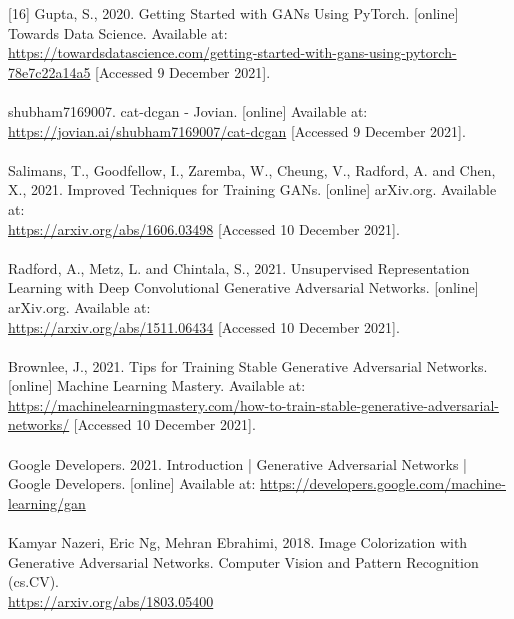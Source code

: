 \documentclass[14pt]{article}
\begin{document}
[16] Gupta, S., 2020. Getting Started with GANs Using PyTorch. [online] Towards Data Science. Available at:
\\
\url{https://towardsdatascience.com/getting-started-with-gans-using-pytorch-78e7c22a14a5} [Accessed 9 December 2021].
\\ \\
[17] shubham7169007. cat-dcgan - Jovian. [online] Available at:\\ \url{https://jovian.ai/shubham7169007/cat-dcgan} [Accessed 9 December 2021].
\\ \\ 
[18] Salimans, T., Goodfellow, I., Zaremba, W., Cheung, V., Radford, A. and Chen, X., 2021. Improved Techniques for Training GANs. [online] arXiv.org. Available at: \\\url{https://arxiv.org/abs/1606.03498} [Accessed 10 December 2021]. 
\\ \\ 
[19] Radford, A., Metz, L. and Chintala, S., 2021. Unsupervised Representation Learning with Deep Convolutional Generative Adversarial Networks. [online] arXiv.org. Available at:\\ \url{https://arxiv.org/abs/1511.06434} [Accessed 10 December 2021]. 
\\ \\
[20] Brownlee, J., 2021. Tips for Training Stable Generative Adversarial Networks. [online] Machine Learning Mastery. Available at:\\ \url{https://machinelearningmastery.com/how-to-train-stable-generative-adversarial-networks/} [Accessed 10 December 2021]. 
\\
\\
[21] Google Developers. 2021. Introduction  |  Generative Adversarial Networks  |  Google Developers. [online] Available at: \url{https://developers.google.com/machine-learning/gan} 
\\
\\
[22] Kamyar Nazeri, Eric Ng, Mehran Ebrahimi, 2018. Image Colorization with Generative Adversarial Networks. Computer Vision and Pattern Recognition (cs.CV).
\\
\url{https://arxiv.org/abs/1803.05400}
\\
\\
\end{document}
